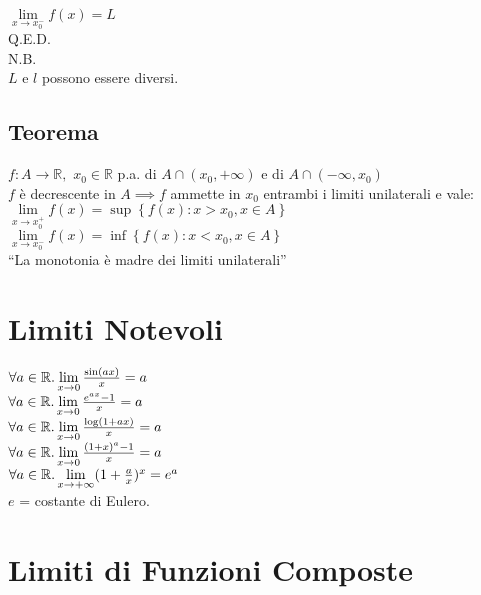 \documentclass[a4paper, twoside, italian, 11pt]{book}
\newcommand{\braces}[1] {\left \{ #1 \right \}}
\newcommand{\R}{\mathbb{R}}
\begin{document}
$\lim\limits_{x \to x_0^-} f(x) = L$ \\

\noindent
Q.E.D. \\

\noindent
N.B. \\
$L$ e $l$ possono essere diversi.


\subsection{Teorema}

\noindent
$f : A \rightarrow \R,$ $x_0 \in \R$ p.a. di $A \cap (x_0, +\infty)$ e di $A \cap (-\infty, x_0)$ \\

\noindent
$f$ è decrescente in $A \implies f$ ammette in $x_0$ entrambi i limiti unilaterali e vale: \\

$\lim\limits_{x \to x_0^+} f(x) = \sup \braces{f(x) : x > x_0, x \in A}$ \\

$\lim\limits_{x \to x_0^-} f(x) = \inf \braces{f(x) : x < x_0, x \in A}$ \\

\noindent
``La monotonia è madre dei limiti unilaterali''



\section{Limiti Notevoli}

\noindent
$\forall a \in \R \ldotp \lim\limits_{x \to 0} \frac{\sin(ax)}{x} = a$ \\

\noindent
$\forall a \in \R \ldotp \lim\limits_{x \to 0} \frac{e^{ax} - 1}{x} = a$ \\

\noindent
$\forall a \in \R \ldotp \lim\limits_{x \to 0} \frac{\log(1+ax)}{x} = a$ \\

\noindent
$\forall a \in \R \ldotp \lim\limits_{x \to 0} \frac{(1+x)^a-1}{x} = a$ \\

\noindent
$\forall a \in \R \ldotp \lim\limits_{x \to +\infty} (1 + \frac a x)^x = e^a$ \\

\noindent
$e$ = costante di Eulero.



\section{Limiti di Funzioni Composte}
\end{document}

